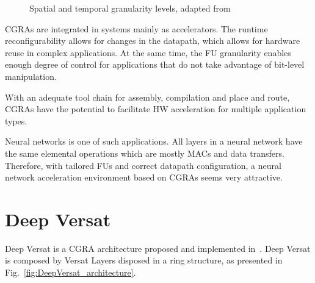 \begin{figure}[!htb]
	\begin{subfigmatrix}{2}
	\end{subfigmatrix}
	\caption{Spatial and temporal granularity levels, adapted from~\cite{CGRA:Overview2016_wijtvliet}}
	\label{fig:CGRA_granularities}
\end{figure}
CGRAs are integrated in systems mainly as accelerators. The runtime
reconfigurability allows for changes in the datapath, which allows for hardware
reuse in complex applications. At the same time, the FU granularity enables
enough degree of control for applications that do not take advantage of
bit-level manipulation.

With an adequate tool chain for assembly, compilation and place and route, CGRAs
have the potential to facilitate HW acceleration for multiple application types.

Neural networks is one of such applications. All layers in a neural network have
the same elemental operations which are mostly MACs and data
transfers. Therefore, with tailored FUs and correct datapath configuration, a
neural network acceleration environment based on CGRAs seems very attractive.
\section{Deep Versat}
\label{sec:Deep_Versat}
Deep Versat is a CGRA architecture proposed and implemented
in~\cite{VMario:Deep_Versat}. Deep Versat is composed by Versat Layers disposed
in a ring structure, as presented in Fig.~\ref{fig:DeepVersat_architecture}.

